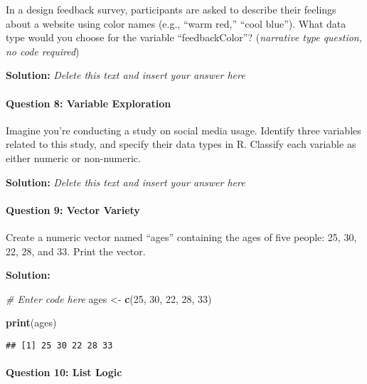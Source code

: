 \documentclass[
]{article}
\newenvironment{Shaded}{\begin{snugshade}}{\end{snugshade}}
\newcommand{\CommentTok}[1]{\textcolor[rgb]{0.56,0.35,0.01}{\textit{#1}}}
\newcommand{\DecValTok}[1]{\textcolor[rgb]{0.00,0.00,0.81}{#1}}
\newcommand{\FunctionTok}[1]{\textcolor[rgb]{0.13,0.29,0.53}{\textbf{#1}}}
\newcommand{\NormalTok}[1]{#1}
\newcommand{\OtherTok}[1]{\textcolor[rgb]{0.56,0.35,0.01}{#1}}
\begin{document}
In a design feedback survey, participants are asked to describe their
feelings about a website using color names (e.g., ``warm red,'' ``cool
blue''). What data type would you choose for the variable
``feedbackColor''? (\emph{narrative type question, no code required})

\textbf{Solution:} \emph{Delete this text and insert your answer here}

\hypertarget{question-8-variable-exploration}{%
\paragraph{Question 8: Variable
Exploration}\label{question-8-variable-exploration}}

Imagine you're conducting a study on social media usage. Identify three
variables related to this study, and specify their data types in R.
Classify each variable as either numeric or non-numeric.

\textbf{Solution:} \emph{Delete this text and insert your answer here}

\hypertarget{question-9-vector-variety}{%
\paragraph{Question 9: Vector Variety}\label{question-9-vector-variety}}

Create a numeric vector named ``ages'' containing the ages of five
people: 25, 30, 22, 28, and 33. Print the vector.

\textbf{Solution:}

\begin{Shaded}
\begin{Highlighting}[]
\CommentTok{\# Enter code here}
\NormalTok{ages }\OtherTok{\textless{}{-}} \FunctionTok{c}\NormalTok{(}\DecValTok{25}\NormalTok{, }\DecValTok{30}\NormalTok{, }\DecValTok{22}\NormalTok{, }\DecValTok{28}\NormalTok{, }\DecValTok{33}\NormalTok{)}

\FunctionTok{print}\NormalTok{(ages)}
\end{Highlighting}
\end{Shaded}

\begin{verbatim}
## [1] 25 30 22 28 33
\end{verbatim}

\hypertarget{question-10-list-logic}{%
\paragraph{Question 10: List Logic}\label{question-10-list-logic}}
\end{document}
